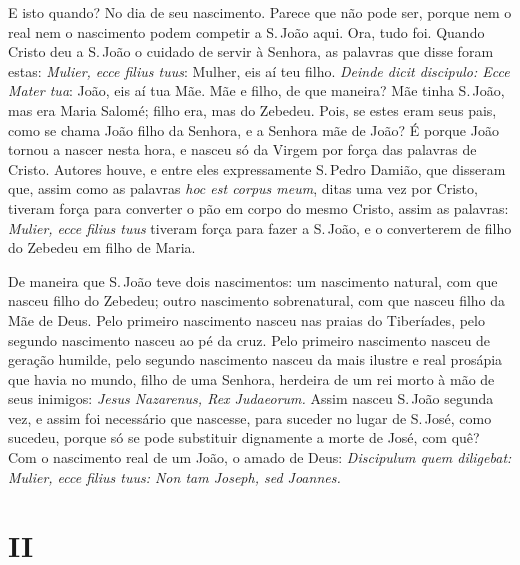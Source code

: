 E isto quando? No dia de seu nascimento. Parece que não pode ser, porque
nem o real nem o nascimento podem competir a S.\,João aqui. Ora, tudo
foi. Quando Cristo deu a S.\,João o cuidado de servir à Senhora, as
palavras que disse foram estas: \emph{Mulier, ecce filius tuus}:
Mulher, eis aí teu filho.
\emph{Deinde dicit discipulo: Ecce Mater tua}: João, eis aí
tua Mãe. Mãe e filho, de que maneira? Mãe tinha S.\,João, mas era Maria
Salomé; filho era, mas do Zebedeu. Pois, se estes eram seus pais, como
se chama João filho da Senhora, e a Senhora mãe de João? É porque João
tornou a nascer nesta hora, e nasceu só da Virgem por força das palavras
de Cristo. Autores houve, e entre eles expressamente S.\,Pedro Damião,
que disseram que, assim como as palavras \emph{hoc est corpus
meum}, ditas uma vez por Cristo, tiveram força para converter o
pão em corpo do mesmo Cristo, assim as palavras: \emph{Mulier, ecce
filius tuus} tiveram força para fazer a S.\,João, e o converterem de
filho do Zebedeu em filho de Maria.

De maneira que S.\,João teve dois nascimentos: um nascimento natural, com
que nasceu filho do Zebedeu; outro nascimento sobrenatural, com que
nasceu filho da Mãe de Deus. Pelo primeiro nascimento nasceu nas praias
do Tiberíades, pelo segundo nascimento nasceu ao pé da cruz. Pelo
primeiro nascimento nasceu de geração humilde, pelo segundo nascimento
nasceu da mais ilustre e real prosápia que havia no mundo, filho de uma
Senhora, herdeira de um rei morto à mão de seus inimigos: \emph{Jesus
Nazarenus, Rex Judaeorum.} Assim nasceu S.\,João segunda vez, e assim
foi necessário que nascesse, para suceder no lugar de S.\,José, como
sucedeu, porque só se pode substituir dignamente a morte de José, com
quê? Com o nascimento real de um João, o amado de Deus: \emph{Discipulum
quem diligebat: Mulier, ecce filius tuus: Non tam Joseph, sed Joannes.}

\section*{II}

